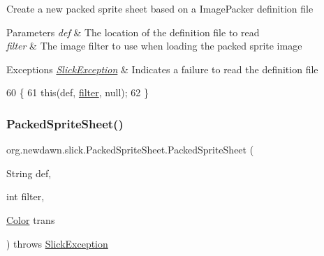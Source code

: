 Create a new packed sprite sheet based on a Image\+Packer definition file


\begin{DoxyParams}{Parameters}
{\em def} & The location of the definition file to read \\
\hline
{\em filter} & The image filter to use when loading the packed sprite image \\
\hline
\end{DoxyParams}

\begin{DoxyExceptions}{Exceptions}
{\em \mbox{\hyperlink{classorg_1_1newdawn_1_1slick_1_1_slick_exception}{Slick\+Exception}}} & Indicates a failure to read the definition file \\
\hline
\end{DoxyExceptions}

\begin{DoxyCode}
60                                                                            \{
61         \textcolor{keyword}{this}(def, \mbox{\hyperlink{classorg_1_1newdawn_1_1slick_1_1_packed_sprite_sheet_a03daeb71e62c853200c961868ce8468a}{filter}}, null);
62     \}
\end{DoxyCode}
\mbox{\label{classorg_1_1newdawn_1_1slick_1_1_packed_sprite_sheet_accda07b70179c28005ed54091408560e}} 
\subsubsection{\texorpdfstring{Packed\+Sprite\+Sheet()}{PackedSpriteSheet()}\hspace{0.1cm}{\footnotesize\ttfamily [4/4]}}
{\footnotesize\ttfamily org.\+newdawn.\+slick.\+Packed\+Sprite\+Sheet.\+Packed\+Sprite\+Sheet (\begin{DoxyParamCaption}\item[{String}]{def,  }\item[{int}]{filter,  }\item[{\mbox{\hyperlink{classorg_1_1newdawn_1_1slick_1_1_color}{Color}}}]{trans }\end{DoxyParamCaption}) throws \mbox{\hyperlink{classorg_1_1newdawn_1_1slick_1_1_slick_exception}{Slick\+Exception}}\hspace{0.3cm}{\ttfamily [inline]}}

